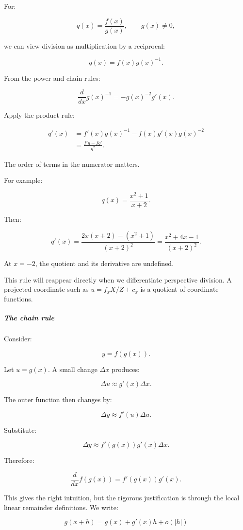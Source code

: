 For:

\[
q(x)=\frac{f(x)}{g(x)},\qquad g(x)\ne0,
\]

we can view division as multiplication by a reciprocal:

\[
q(x)=f(x)g(x)^{-1}.
\]

From the power and chain rules:

\[
\frac d{dx}g(x)^{-1} =-g(x)^{-2}g'(x).
\]

Apply the product rule:

\[
\begin{aligned} q'(x) &=f'(x)g(x)^{-1} -f(x)g'(x)g(x)^{-2}\\ &=\boxed{\frac{f'g-fg'}{g^2}}. \end{aligned}
\]

The order of terms in the numerator matters.

For example:

\[
q(x)=\frac{x^2+1}{x+2}.
\]

Then:

\[
q'(x)= \frac{2x(x+2)-(x^2+1)}{(x+2)^2} = \frac{x^2+4x-1}{(x+2)^2}.
\]

At \(x=-2\), the quotient and its derivative are undefined.

This rule will reappear directly when we differentiate perspective division. A projected coordinate such as \(u=f_xX/Z+c_x\) is a quotient of coordinate functions.

\subparagraph{The chain rule}\label{01-foundations-i-ch020-the-chain-rule}

\hypertarget{01-foundations-i-ch020-the-chain-rule}{}

Consider:

\[
y=f(g(x)).
\]

Let \(u=g(x)\). A small change \(\Delta x\) produces:

\[
\Delta u\approx g'(x)\Delta x.
\]

The outer function then changes by:

\[
\Delta y\approx f'(u)\Delta u.
\]

Substitute:

\[
\Delta y\approx f'(g(x))g'(x)\Delta x.
\]

Therefore:

\[
\boxed{\frac d{dx}f(g(x))=f'(g(x))g'(x)}.
\]

This gives the right intuition, but the rigorous justification is through the local linear remainder definitions. We write:

\[
g(x+h)=g(x)+g'(x)h+o(|h|)
\]

